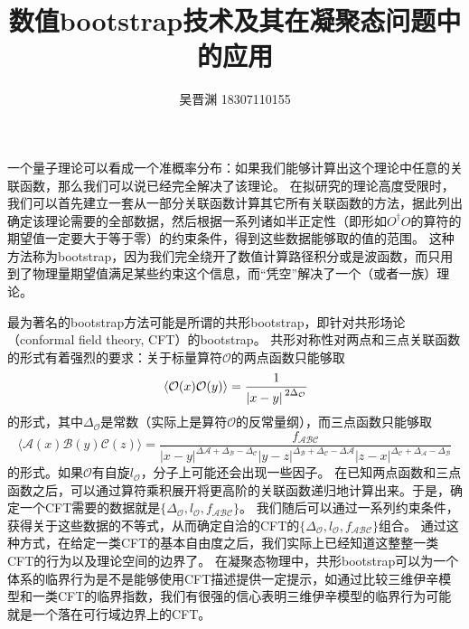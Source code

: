 \documentclass[hyperref, UTF8, a4paper]{ctexart}
\title{数值bootstrap技术及其在凝聚态问题中的应用}
\author{吴晋渊 18307110155}
\begin{document}
\maketitle

一个量子理论可以看成一个准概率分布：如果我们能够计算出这个理论中任意的关联函数，那么我们可以说已经完全解决了该理论。
在拟研究的理论高度受限时，我们可以首先建立一套从一部分关联函数计算其它所有关联函数的方法，据此列出确定该理论需要的全部数据，然后根据一系列诸如半正定性（即形如$O^\dagger O$的算符的期望值一定要大于等于零）的约束条件，得到这些数据能够取的值的范围。
这种方法称为bootstrap，因为我们完全绕开了数值计算路径积分或是波函数，而只用到了物理量期望值满足某些约束这个信息，而“凭空”解决了一个（或者一族）理论\cite{bhattacharya2021}。

最为著名的bootstrap方法可能是所谓的共形bootstrap，即针对共形场论（conformal field theory, CFT）的bootstrap。
共形对称性对两点和三点关联函数的形式有着强烈的要求：关于标量算符$\mathcal{O}$的两点函数只能够取
\begin{equation}
    \expval*{\mathcal{O}(x) \mathcal{O}(y)} = \frac{1}{\abs*{x - y}^{2 \Delta_\mathcal{O}}}
    \label{eq:two-point-conformal}
\end{equation}
的形式，其中$\Delta_{\mathcal{O}}$是常数（实际上是算符$\mathcal{O}$的反常量纲），而三点函数只能够取
\begin{equation}
    \langle\mathcal{A}(x) \mathcal{B}(y) \mathcal{C}(z)\rangle = \frac{f_{\mathcal{A B C}}}{|x-y|^{\Delta \mathcal{A}+\Delta_{\mathcal{B}}-\Delta_{\mathcal{C}}}|y-z|^{\Delta_{\mathcal{B}}+\Delta_{\mathcal{C}}-\Delta \mathcal{A}}|z-x|^{\Delta_{\mathcal{C}}+\Delta_{\mathcal{A}}-\Delta_{\mathcal{B}}}}
    \label{eq:three-point-conformal}
\end{equation}
的形式。如果$\mathcal{O}$有自旋$l_{\mathcal{O}}$，分子上可能还会出现一些因子。
在已知两点函数和三点函数之后，可以通过算符乘积展开将更高阶的关联函数递归地计算出来。于是，确定一个CFT需要的数据就是$\{\Delta_{\mathcal{O}}, l_{\mathcal{O}}, f_{\mathcal{A} \mathcal{B} \mathcal{C}}\}$。
我们随后可以通过一系列约束条件，获得关于这些数据的不等式，从而确定自洽的CFT的$\{\Delta_{\mathcal{O}}, l_{\mathcal{O}}, f_{\mathcal{A} \mathcal{B} \mathcal{C}}\}$组合。
通过这种方式，在给定一类CFT的基本自由度之后，我们实际上已经知道这整整一类CFT的行为以及理论空间的边界了\cite{Poland_2016,2019}。
在凝聚态物理中，共形bootstrap可以为一个体系的临界行为是不是能够使用CFT描述提供一定提示，如通过比较三维伊辛模型和一类CFT的临界指数，我们有很强的信心表明三维伊辛模型的临界行为可能就是一个落在可行域边界上的CFT\cite{prd2012ising,Poland_2016}。
\end{document}
